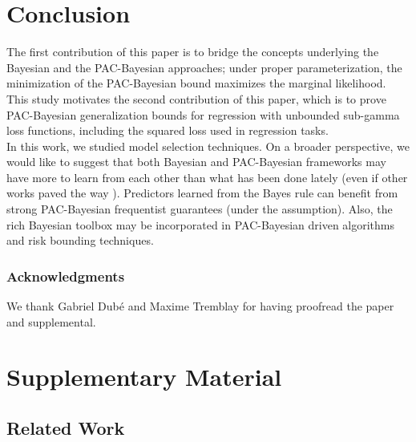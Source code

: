 \documentclass{article}
\theoremstyle{definition}
\theoremstyle{plain}
\def\LONGVERSION{}
\begin{document}
\vspace{-1mm}

\section{Conclusion}
 

The first contribution of this paper is to bridge the concepts underlying the Bayesian and the PAC-Bayesian approaches;
%
under proper parameterization, the minimization of the PAC-Bayesian bound maximizes the marginal likelihood. 
This study 
%
motivates the second contribution of this paper, which is to prove PAC-Bayesian generalization bounds for regression with unbounded sub-gamma loss functions, including the squared loss used in regression tasks.\\[1mm]
%
In this work, we studied model selection techniques.  On a broader perspective, we would like to suggest that both Bayesian and PAC-Bayesian frameworks may have more to learn from each other than what has been done lately (even if other works paved the way \cite[\eg,][]{bissiri-16,grunwald-2012,seeger-thesis}). 
%
%
%
%
Predictors learned from the Bayes rule can benefit from strong PAC-Bayesian frequentist guarantees (under the \iid assumption).
Also, the rich Bayesian toolbox may be incorporated in PAC-Bayesian driven algorithms and risk bounding techniques.

\subsubsection*{Acknowledgments}

We thank Gabriel Dubé and Maxime Tremblay for having proofread the paper and supplemental. 
%
%
%

%

%
%
%
%
%
%
%

\newpage

\ifdefined\LONGVERSION\else
\begin{small}
	\setlength{\bibsep}{1.5pt} %
		

\end{small}

%


\newpage
\fi

\appendix
\section{Supplementary Material}
\label{appendix}

\subsection{Related Work}
\label{appendix:related}
\end{document}
